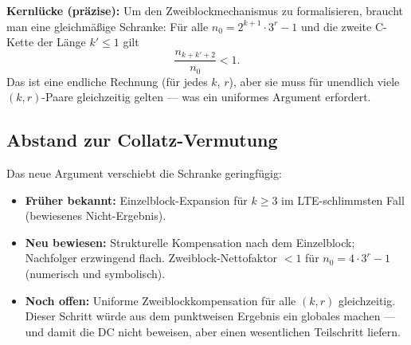 \documentclass[12pt,a4paper]{article}
\begin{document}
\begin{tcolorbox}[lücke]
\textbf{Kernlücke (präzise):} Um den Zweiblockmechanismus zu formalisieren,
braucht man eine gleichmäßige Schranke: Für alle $n_0 = 2^{k+1}\cdot 3^r-1$
und die zweite C-Kette der Länge $k' \leq 1$ gilt
\[
  \frac{n_{k+k'+2}}{n_0} < 1.
\]
Das ist eine endliche Rechnung (für jedes $k$, $r$), aber sie muss
für unendlich viele $(k,r)$-Paare gleichzeitig gelten --- was ein
uniformes Argument erfordert.
\end{tcolorbox}

\subsection{Abstand zur Collatz-Vermutung}

Das neue Argument verschiebt die Schranke geringfügig:
\begin{itemize}
  \item \textbf{Früher bekannt:} Einzelblock-Expansion für $k\geq 3$
    im LTE-schlimmsten Fall (bewiesenes Nicht-Ergebnis).
  \item \textbf{Neu bewiesen:} Strukturelle Kompensation nach dem
    Einzelblock; Nachfolger erzwingend flach. Zweiblock-Nettofaktor
    $< 1$ für $n_0 = 4\cdot 3^r - 1$ (numerisch und symbolisch).
  \item \textbf{Noch offen:} Uniforme Zweiblockkompensation für alle
    $(k,r)$ gleichzeitig. Dieser Schritt würde aus dem punktweisen
    Ergebnis ein globales machen --- und damit die DC nicht beweisen,
    aber einen wesentlichen Teilschritt liefern.
\end{itemize}
\end{document}
